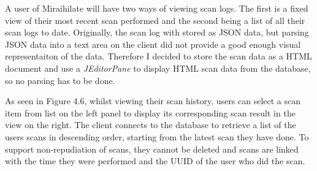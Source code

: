 A user of Miraihilate will have two ways of viewing scan logs. The first is a fixed view of their most recent scan performed and the second being a list of all their scan logs to date. Originally, the scan log with stored as JSON data, but parsing JSON data into a text area on the client did not provide a good enough visual representaiton of the data. Therefore I decided to store the scan data as a HTML document and use a \textit{JEditorPane} to display HTML scan data from the database, so no parsing has to be done.

\vspace{2cm}

As seen in Figure 4.6, whilst viewing their scan history, users can select a scan item from list on the left panel to display its corresponding scan result in the view on the right. The client connects to the database to retrieve a list of the users scans in descending order, starting from the latest scan they have done. To support non-repudiation of scans, they cannot be deleted and scans are linked with the time they were performed and the UUID of the user who did the scan.

\vspace{0.5cm}

